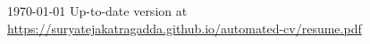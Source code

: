\documentclass[11pt, a4paper]{awesome-cv}
\begin{document}
\makecvheader[C]

\makecvfooter
{\today}
{Up-to-date version at \upshape\color{text}\url{https://suryatejakatragadda.github.io/automated-cv/resume.pdf}}
{\thepage}



\medskip
\vspace{1em}

\vspace{-1em}



\medskip

\end{document}

